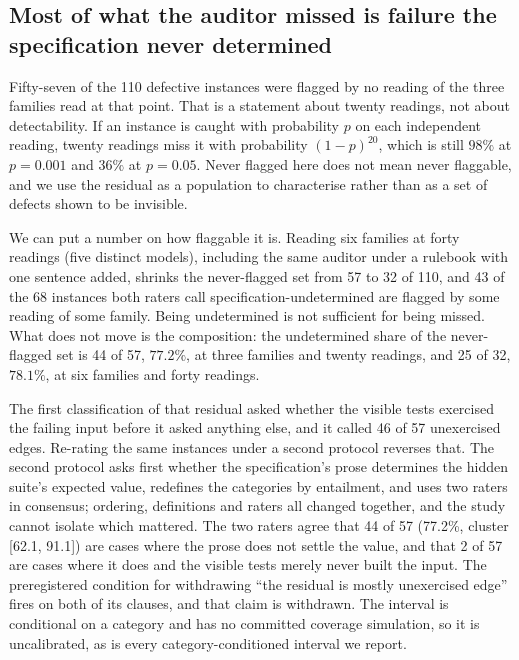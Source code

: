 \subsection{Most of what the auditor missed is failure the specification never determined}
\label{sec:residual}

Fifty-seven of the 110 defective instances were flagged by no reading of the three families read
at that point. That is a statement about twenty readings, not about detectability. If an instance
is caught with probability $p$ on each independent reading, twenty readings miss it with
probability $(1-p)^{20}$, which is still $98\%$ at $p = 0.001$ and $36\%$ at $p = 0.05$. Never
flagged here does not mean never flaggable, and we use the residual as a population to
characterise rather than as a set of defects shown to be invisible.

We can put a number on how flaggable it is. Reading six families at forty readings (five distinct models), including the
same auditor under a rulebook with one sentence added, shrinks the never-flagged set from 57 to
32 of 110, and 43 of the 68 instances both raters call specification-undetermined
are flagged by some reading of some family. Being undetermined is not sufficient for being
missed. What does not move is the composition: the undetermined share of the never-flagged set is
44 of 57, $77.2\%$, at three families and twenty readings, and 25 of 32,
$78.1\%$, at six families and forty readings.

The first classification of that residual asked whether the visible tests exercised the failing
input before it asked anything else, and it called 46 of 57 unexercised edges. Re-rating the same
instances under a second protocol reverses that. The second protocol asks first whether the
specification's prose determines the hidden suite's expected value, redefines the categories by
entailment, and uses two raters in consensus; ordering, definitions and raters all changed
together, and the study cannot isolate which mattered. The two raters agree that 44 of 57
(77.2\%, cluster [62.1, 91.1]) are cases where the prose does not settle the value, and that 2 of
57 are cases where it does and the visible tests merely never built the input. The preregistered
condition for withdrawing ``the residual is mostly unexercised edge'' fires on both of its
clauses, and that claim is withdrawn. The interval is conditional on a category and has no
committed coverage simulation, so it is uncalibrated, as is every category-conditioned interval we
report.

